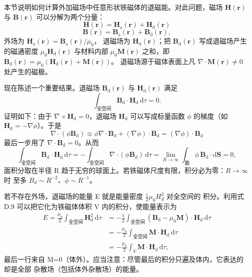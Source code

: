 本节说明如何计算外加磁场中任意形状铁磁体的退磁能。对此问题，磁场
$\mathbf{H}(\mathbf{r})$ 与 $\mathbf{B}(\mathbf{r})$ 可以分解为两个分量：
\begin{equation*}
\mathbf{H}(\mathbf{r}) = \mathbf{H}_{\mathrm{a}}(\mathbf{r}) + \mathbf{H}_{\mathrm{d}}(\mathbf{r})\tag{D.7}
\end{equation*}
\begin{equation*}
\mathbf{B}(\mathbf{r}) = \mathbf{B}_{\mathrm{a}}(\mathbf{r}) + \mathbf{B}_{\mathrm{d}}(\mathbf{r}),\tag{D.8}
\end{equation*}
外场为 $\mathbf{H}_{\mathrm{a}}(\mathbf{r})=\mathbf{B}_{\mathrm{a}}(\mathbf{r})/\mu_0$，
退磁场为 $\mathbf{H}_{\mathrm{d}}(\mathbf{r})$；把 $\mathbf{B}_{\mathrm{d}}(\mathbf{r})$
写成退磁场产生的磁通密度 $\mu_0\mathbf{H}_{\mathrm{d}}(\mathbf{r})$ 与材料内部
$\mu_0\mathbf{M}(\mathbf{r})$ 之和，即
$\mathbf{B}_{\mathrm{d}}(\mathbf{r})=\mu_0(\mathbf{H}_{\mathrm{d}}(\mathbf{r})+\mathbf{M}(\mathbf{r}))$。
退磁场源于磁体表面上凡 $\nabla\cdot\mathbf{M}(\mathbf{r})\neq0$ 处产生的磁极。

现在陈述一个重要结果。退磁场 $\mathbf{B}_{\mathrm{d}}(\mathbf{r})$ 与
$\mathbf{H}_{\mathrm{d}}(\mathbf{r})$ 满足
\begin{equation*}
\int_{\text{全空间}}\mathbf{B}_{\mathrm{d}}\cdot\mathbf{H}_{\mathrm{d}}\,\mathrm{d}\tau = 0.\tag{D.9}
\end{equation*}
证明如下：由于 $\nabla\times\mathbf{H}_{\mathrm{d}}=0$，退磁场 $\mathbf{H}_{\mathrm{d}}$
可以写成标量函数 $\phi$ 的梯度（如 $\mathbf{H}_{\mathrm{d}}=-\nabla\phi$）。于是
\begin{equation*}
\nabla\cdot(\phi\mathbf{B}_{\mathrm{d}}) \equiv \phi\nabla\cdot\mathbf{B}_{\mathrm{d}} + (\nabla\phi)\cdot\mathbf{B}_{\mathrm{d}} = (\nabla\phi)\cdot\mathbf{B}_{\mathrm{d}}\tag{D.10}
\end{equation*}
最后一步用了 $\nabla\cdot\mathbf{B}_{\mathrm{d}}=0$。从而
\begin{equation*}
\int_{\text{全空间}}\mathbf{B}_{\mathrm{d}}\cdot\mathbf{H}_{\mathrm{d}}\,\mathrm{d}\tau = -\int_{\text{全空间}}\nabla\cdot(\phi\mathbf{B}_{\mathrm{d}})\,\mathrm{d}\tau = \lim_{R\to\infty}\int_{\text{面}}\phi\,\mathbf{B}_{\mathrm{d}}\cdot\mathrm{d}\mathbf{S} = 0,\tag{D.11}
\end{equation*}
面积分取在半径 R 趋于无穷的球面上。若铁磁体尺度有限，积分必为零：$R\to\infty$ 时
至多 $B_d\sim R^{-2}$、$\phi\sim R^{-1}$。

若不存在外场，退磁场的能量 E 就是能量密度 $\frac{1}{2}\mu_0H_d^{2}$ 对全空间的
积分。利用式 D.9 可以把它化为铁磁体体积 V 内的积分，使能量表示为
\begin{align*}
E = \frac{\mu_0}{2}\int_{\text{全空间}}\mathbf{H}_{\mathrm{d}}^{2}\,\mathrm{d}\tau &= -\frac{1}{2}\int_{\text{全空间}}(\mathbf{B}_{\mathrm{d}}-\mu_0\mathbf{M})\cdot\mathbf{H}_{\mathrm{d}}\,\mathrm{d}\tau\\
&= -\frac{\mu_0}{2}\int_{\text{全空间}}\mathbf{M}\cdot\mathbf{H}_{\mathrm{d}}\,\mathrm{d}\tau\\
&= -\frac{\mu_0}{2}\int_V\mathbf{M}\cdot\mathbf{H}_{\mathrm{d}}\,\mathrm{d}\tau,\tag{D.12}
\end{align*}
最后一行来自 M=0（体外）。应当注意：尽管最后的积分只遍及体内，它表达的却是全部
杂散场（包括体外杂散场）的能量。

